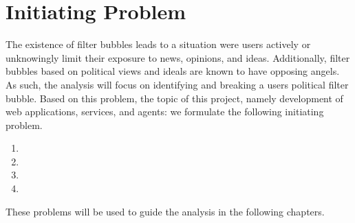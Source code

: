\section*{Initiating Problem} 
The existence of filter bubbles leads to a situation were users actively or
unknowingly limit their exposure to news, opinions, and ideas. Additionally,
filter bubbles based on political views and ideals are known to have opposing
angels. As such, the analysis will focus on identifying and breaking a users
political filter bubble. Based on this problem, the topic of this project,
namely development of web applications, services, and agents: we formulate the
following initiating problem.


\begin{center}
\begin{minipage}{0.95\linewidth}

\begin{enumerate}
  \item {}
  
  \item {}
  
  \item {}
  
  \item {}
  
\end{enumerate}
\end{minipage}
\end{center}

These problems will be used to guide the analysis in the following chapters.